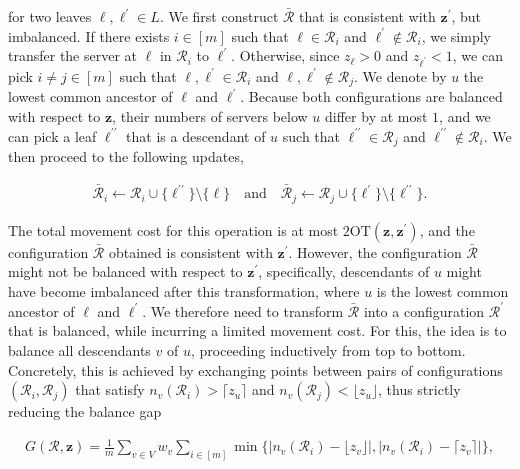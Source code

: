 \documentclass[10pt,a4paper]{article}
\begin{document}
for two leaves $\ell,\ell^{\prime}\in L$.
We first construct $\bar{\mathcal{R}}$ that is consistent with ${\mathbf{z}}^{\prime}$, but imbalanced.
If there exists $i\in[m]$ such that $\ell\in\mathcal{R}_{i}$ and $\ell^{\prime}\not\in\mathcal{R}_{i}$, we simply transfer the server at $\ell$ in $\mathcal{R}_{i}$ to $\ell^{\prime}$. Otherwise, since $z_{\ell}>0$ and $z_{\ell^{\prime}}<1$, we can pick $i\neq j\in[m]$ such that $\ell,\ell^{\prime}\in\mathcal{R}_{i}$ and $\ell,\ell^{\prime}\not\in\mathcal{R}_{j}$. We denote by $u$ the lowest common ancestor of $\ell$ and $\ell^{\prime}$. Because both configurations are balanced with respect to ${\mathbf{z}}$, their numbers of servers below $u$ differ by at most $1$, and we can pick a leaf $\ell^{\prime\prime}$ that is a descendant of $u$ such that $\ell^{\prime\prime}\in\mathcal{R}_{j}$ and $\ell^{\prime\prime}\not\in\mathcal{R}_{i}$. We then proceed to the following updates,\par


\[\begin{gathered}
\bar{\mathcal{R}}_{i}\leftarrow\mathcal{R}_{i}\cup\{\ell^{\prime\prime}\}\setminus\{\ell\}\quad\text{and}\quad\bar{\mathcal{R}}_{j}\leftarrow\mathcal{R}_{j}\cup\{\ell^{\prime}\}\setminus\{\ell^{\prime\prime}\}.
\end{gathered}\]


The total movement cost for this operation is at most $2\text{OT}({\mathbf{z}},{\mathbf{z}}^{\prime})$, and the configuration $\bar{\mathcal{R}}$ obtained is consistent with ${\mathbf{z}}^{\prime}$. However, the configuration $\bar{\mathcal{R}}$ might not be balanced with respect to ${\mathbf{z}}^{\prime}$, specifically, descendants of $u$ might have become imbalanced after this transformation, where $u$ is the lowest common ancestor of $\ell$ and $\ell^{\prime}$. We therefore need to transform $\bar{\mathcal{R}}$ into a configuration $\mathcal{R}^{\prime}$ that is balanced, while incurring a limited movement cost. For this, the idea is to balance all descendants $v$ of $u$, proceeding inductively from top to bottom. Concretely, this is achieved by exchanging points between pairs of configurations $(\mathcal{R}_{i},\mathcal{R}_{j})$ that satisfy $n_{v}(\mathcal{R}_{i})>{\lceil z_{u}\rceil}$ and $n_{v}(\mathcal{R}_{j})<{\lfloor z_{u}\rfloor}$, thus strictly reducing the balance gap\par


\[\begin{gathered}
G(\mathcal{R},{\mathbf{z}})=\frac{1}{m}\sum_{v\in V}w_{v}\sum_{i\in[m]}\min\{|n_{v}(\mathcal{R}_{i})-{\lfloor z_{v}\rfloor}|,|n_{v}(\mathcal{R}_{i})-{\lceil
z_{v}\rceil}|\},
\end{gathered}\]
\end{document}
